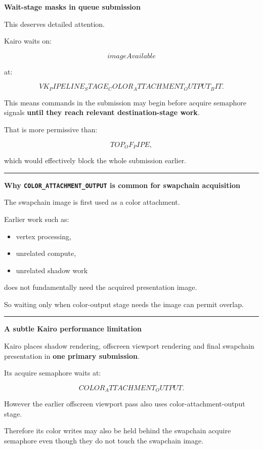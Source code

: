 \textbf{Wait-stage masks in queue submission}

This deserves detailed attention.

Kairo waits on:

\[
imageAvailable
\]

at:

\[
VK_PIPELINE_STAGE_COLOR_ATTACHMENT_OUTPUT_BIT.
\]

This means commands in the submission may begin before acquire semaphore signals \textbf{until they reach relevant destination-stage work}.

That is more permissive than:

\[
TOP_OF_PIPE,
\]

which would effectively block the whole submission earlier.

\begin{center}\rule{0.5\linewidth}{0.5pt}\end{center}

\textbf{Why \texttt{COLOR\_ATTACHMENT\_OUTPUT} is common for swapchain acquisition}

The swapchain image is first used as a color attachment.

Earlier work such as:

\begin{itemize}
\tightlist
\item
  vertex processing,
\item
  unrelated compute,
\item
  unrelated shadow work
\end{itemize}

does not fundamentally need the acquired presentation image.

So waiting only when color-output stage needs the image can permit overlap.

\begin{center}\rule{0.5\linewidth}{0.5pt}\end{center}

\textbf{A subtle Kairo performance limitation}

Kairo places shadow rendering, offscreen viewport rendering and final swapchain presentation in \textbf{one primary submission}.

Its acquire semaphore waits at:

\[
COLOR_ATTACHMENT_OUTPUT.
\]

However the earlier offscreen viewport pass also uses color-attachment-output stage.

Therefore its color writes may also be held behind the swapchain acquire semaphore even though they do not touch the swapchain image.

